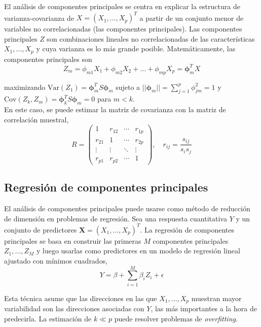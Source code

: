 El análisis de componentes principales se centra en explicar la estructura de varianza-covarianza de $X = (X_1, \dots, X_p)^T$ a partir de un conjunto menor de variables no correlacionadas (las componentes principales). Las componentes principales $Z$ son combinaciones lineales no correlacionadas de las características $X_1, \dots, X_p$ y cuya varianza es lo más grande posible. Matemáticamente, las componentes principales son 
\begin{equation}
Z_m = \phi_{m1}X_1 + \phi_{m2}X_2 + \dots + \phi_{mp}X_p = \boldsymbol{\phi}_m^T X
\end{equation}

maximizando $\text{Var}(Z_1) = \boldsymbol{\phi}_m^T S \boldsymbol{\phi}_m$ sujeto a $||\boldsymbol{\phi}_m|| = \sum_{j=1}^p \phi_{jm}^2 = 1$ y $\text{Cov} (Z_k, Z_m) = \boldsymbol{\phi}_k^T S \boldsymbol{\phi}_m = 0$ para $m < k$. \\

\noindent En este caso, se puede estimar la matriz de covarianza con la matriz de correlación muestral, 
\begin{equation}
R = \begin{pmatrix}
1 & r_{12} & \cdots & r_{1p} \\
r_{21} & 1 & \cdots & r_{2p} \\
\vdots & \vdots & \ddots & \vdots \\
r_{p1} & r_{p2} & \cdots & 1
\end{pmatrix}, \quad r_{ij} = \frac{s_{ij}}{s_i s_j}
\end{equation}

\subsection{Regresión de componentes principales}

El análisis de componentes principales puede usarse como método de reducción de dimensión en problemas de regresión. Sea una respuesta cuantitativa $Y$ y un conjunto de predictores $\mathbf{X} = (X_1, \dots, X_p)^T$. La regresión de componentes principales se basa en construir las primeras $M$ componentes principales $Z_1, \dots, Z_M$ y luego usarlas como predictores en un modelo de regresión lineal ajustado con mínimos cuadrados, 
\begin{equation}
Y = \beta + \sum_{i=1}^M \beta_i Z_i + \epsilon
\end{equation}

Esta técnica asume que las direcciones en las que $X_1, \dots, X_p$ muestran mayor variabilidad son las direcciones asociadas con $Y$, las más importantes a la hora de predecirla. La estimación de $k \ll p$ puede resolver problemas de \textit{overfitting}.


